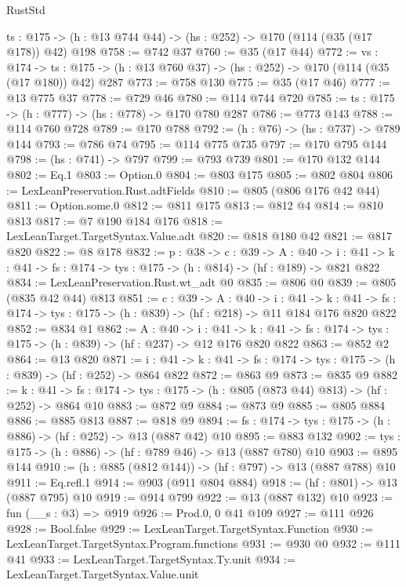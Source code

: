 \begin{lexlean}{RustStd}
\begin{coremodule}
  {ts : @175} -> (h : @13 @744 @44) -> (hs : @252) -> @170 (@114 (@35 (@17 @178)) @42) @198
@758 := @742 @37
@760 := @35 (@17 @44)
@772 := {vs : @174} ->
  {ts : @175} -> (h : @13 @760 @37) -> (hs : @252) -> @170 (@114 (@35 (@17 @180)) @42) @287
@773 := @758 @130
@775 := @35 (@17 @46)
@777 := @13 @775 @37
@778 := @729 @46
@780 := @114 @744 @720
@785 := {ts : @175} -> (h : @777) -> (hs : @778) -> @170 @780 @287
@786 := @773 @143
@788 := @114 @760 @728
@789 := @170 @788
@792 := (h : @76) -> (hs : @737) -> @789 @144
@793 := @786 @74
@795 := @114 @775 @735
@797 := @170 @795 @144
@798 := (hs : @741) -> @797
@799 := @793 @739
@801 := @170 @132 @144
@802 := Eq.{1}
@803 := Option.{0}
@804 := @803 @175
@805 := @802 @804
@806 := LexLeanPreservation.Rust.adtFields
@810 := @805 (@806 @176 @42 @44)
@811 := Option.some.{0}
@812 := @811 @175
@813 := @812 @4
@814 := @810 @813
@817 := @7 @190 @184 @176
@818 := LexLeanTarget.TargetSyntax.Value.adt
@820 := @818 @180 @42
@821 := @817 @820
@822 := @8 @178
@832 := {p : @38} ->
  {c : @39} ->
  {A : @40} ->
  {i : @41} -> {k : @41} -> {fs : @174} -> {tys : @175} -> (h : @814) -> (hf : @189) -> @821 @822
@834 := LexLeanPreservation.Rust.wt_adt @0
@835 := @806 @0
@839 := @805 (@835 @42 @44) @813
@851 := {c : @39} ->
  {A : @40} ->
  {i : @41} ->
  {k : @41} -> {fs : @174} -> {tys : @175} -> (h : @839) -> (hf : @218) -> @11 @184 @176 @820 @822
@852 := @834 @1
@862 := {A : @40} ->
  {i : @41} ->
  {k : @41} -> {fs : @174} -> {tys : @175} -> (h : @839) -> (hf : @237) -> @12 @176 @820 @822
@863 := @852 @2
@864 := @13 @820
@871 := {i : @41} ->
  {k : @41} -> {fs : @174} -> {tys : @175} -> (h : @839) -> (hf : @252) -> @864 @822
@872 := @863 @9
@873 := @835 @9
@882 := {k : @41} ->
  {fs : @174} -> {tys : @175} -> (h : @805 (@873 @44) @813) -> (hf : @252) -> @864 @10
@883 := @872 @9
@884 := @873 @9
@885 := @805 @884
@886 := @885 @813
@887 := @818 @9
@894 := {fs : @174} -> {tys : @175} -> (h : @886) -> (hf : @252) -> @13 (@887 @42) @10
@895 := @883 @132
@902 := {tys : @175} -> (h : @886) -> (hf : @789 @46) -> @13 (@887 @780) @10
@903 := @895 @144
@910 := (h : @885 (@812 @144)) -> (hf : @797) -> @13 (@887 @788) @10
@911 := Eq.refl.{1}
@914 := @903 (@911 @804 @884)
@918 := (hf : @801) -> @13 (@887 @795) @10
@919 := @914 @799
@922 := @13 (@887 @132) @10
@923 := fun (__s : @3) => @919
@926 := Prod.{0, 0} @41 @109
@927 := @111 @926
@928 := Bool.false
@929 := LexLeanTarget.TargetSyntax.Function
@930 := LexLeanTarget.TargetSyntax.Program.functions
@931 := @930 @0
@932 := @111 @41
@933 := LexLeanTarget.TargetSyntax.Ty.unit
@934 := LexLeanTarget.TargetSyntax.Value.unit

\end{coremodule}
\end{lexlean}
